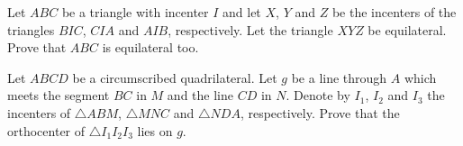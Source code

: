 \item[\textbf{G7.}]
Let 
$ABC$
 be a triangle with incenter 
$I$
 and let 
$X$, 
$Y$
 and 
$Z$
 be the incenters of the triangles 
$BIC$, 
$CIA$
 and 
$AIB$, 
 respectively. Let the triangle 
$XYZ$
 be equilateral. Prove that 
$ABC$
 is equilateral too.

\item[\textbf{G8.}]
Let 
$ABCD$
 be a circumscribed quadrilateral. Let 
$g$
 be a line through 
$A$
 which meets the segment 
$BC$
 in 
$M$
 and the line 
$CD$
 in 
$N$.
 Denote by 
$I_1$, 
$I_2$
 and 
$I_3$
 the incenters of 
$\triangle ABM$, 
$\triangle MNC$
 and 
$\triangle NDA$, 
 respectively. Prove that the orthocenter of 
$\triangle I_1I_2I_3$
 lies on 
$g$.